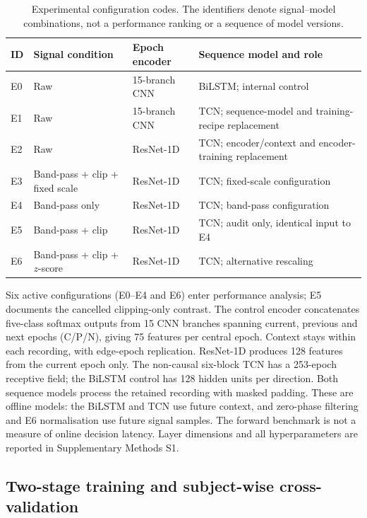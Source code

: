 \documentclass[11pt,a4paper]{article}
\begin{document}
\begin{table}[H]
\centering
\caption{Experimental configuration codes. The identifiers denote signal--model combinations, not a
performance ranking or a sequence of model versions.}
\label{tab:configs}
\small
\begin{tabularx}{\textwidth}{llYY}
\toprule
\textbf{ID} & \textbf{Signal condition} & \textbf{Epoch encoder} & \textbf{Sequence model and role} \\
\midrule
E0 & Raw & 15-branch CNN & BiLSTM; internal control \\
E1 & Raw & 15-branch CNN & TCN; sequence-model and training-recipe replacement \\
E2 & Raw & ResNet-1D & TCN; encoder/context and encoder-training replacement \\
E3 & Band-pass + clip + fixed scale & ResNet-1D & TCN; fixed-scale configuration \\
E4 & Band-pass only & ResNet-1D & TCN; band-pass configuration \\
E5 & Band-pass + clip & ResNet-1D & TCN; audit only, identical input to E4 \\
E6 & Band-pass + clip + $z$-score & ResNet-1D & TCN; alternative rescaling \\
\bottomrule
\end{tabularx}
\end{table}

Six active configurations (E0--E4 and E6) enter performance analysis; E5 documents the cancelled
clipping-only contrast. The control encoder concatenates five-class softmax outputs from 15 CNN branches
spanning current, previous and next epochs (C/P/N), giving 75 features per central epoch.
Context stays within each recording, with edge-epoch replication. ResNet-1D produces 128 features from the current epoch only. The
non-causal six-block TCN has a 253-epoch receptive field; the BiLSTM control has 128 hidden units per
direction. Both sequence models process the retained recording with masked padding. These are offline
models: the BiLSTM and TCN use future context, and zero-phase filtering and E6 normalisation use future
signal samples. The forward benchmark is not a measure of online decision latency. Layer dimensions and
all hyperparameters are reported in Supplementary Methods S1.

\subsection{Two-stage training and subject-wise cross-validation}
\end{document}
